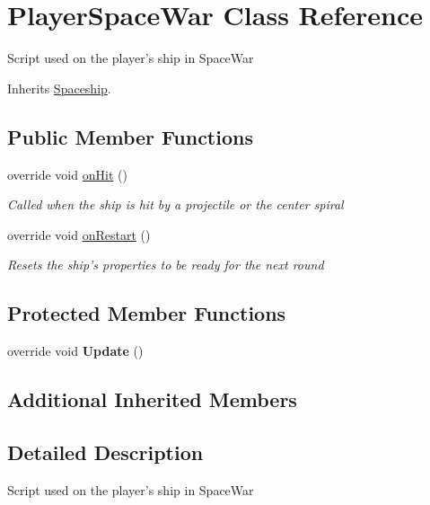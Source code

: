 \hypertarget{class_player_space_war}{\section{Player\-Space\-War Class Reference}
\label{class_player_space_war}
}


Script used on the player's ship in Space\-War  




Inherits \hyperlink{class_spaceship}{Spaceship}.

\subsection*{Public Member Functions}
\begin{DoxyCompactItemize}
\item 
override void \hyperlink{class_player_space_war_a559ee4c4f5c7813ccb4c3e159e8db6f9}{on\-Hit} ()
\begin{DoxyCompactList}\small\item\em Called when the ship is hit by a projectile or the center spiral \end{DoxyCompactList}\item 
override void \hyperlink{class_player_space_war_acfc8f5a98face5c04f40e8f65dd924e4}{on\-Restart} ()
\begin{DoxyCompactList}\small\item\em Resets the ship's properties to be ready for the next round \end{DoxyCompactList}\end{DoxyCompactItemize}
\subsection*{Protected Member Functions}
\begin{DoxyCompactItemize}
\item 
\hypertarget{class_player_space_war_a9a52dc2193e05539598ebb4fd77e169e}{override void {\bfseries Update} ()}\label{class_player_space_war_a9a52dc2193e05539598ebb4fd77e169e}

\end{DoxyCompactItemize}
\subsection*{Additional Inherited Members}


\subsection{Detailed Description}
Script used on the player's ship in Space\-War 



